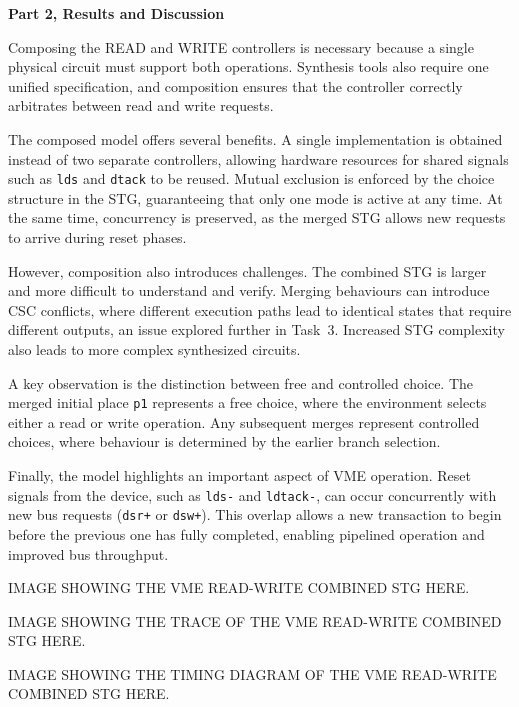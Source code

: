 \documentclass[a4paper,12pt]{article}
\begin{document}
\textbf{Part 2, Results and Discussion}

Composing the READ and WRITE controllers is necessary because a single physical circuit must support both operations. Synthesis tools also require one unified specification, and composition ensures that the controller correctly arbitrates between read and write requests.

The composed model offers several benefits. A single implementation is obtained instead of two separate controllers, allowing hardware resources for shared signals such as \texttt{lds} and \texttt{dtack} to be reused. Mutual exclusion is enforced by the choice structure in the STG, guaranteeing that only one mode is active at any time. At the same time, concurrency is preserved, as the merged STG allows new requests to arrive during reset phases.

However, composition also introduces challenges. The combined STG is larger and more difficult to understand and verify. Merging behaviours can introduce CSC conflicts, where different execution paths lead to identical states that require different outputs, an issue explored further in Task~3. Increased STG complexity also leads to more complex synthesized circuits.

A key observation is the distinction between free and controlled choice. The merged initial place \texttt{p1} represents a free choice, where the environment selects either a read or write operation. Any subsequent merges represent controlled choices, where behaviour is determined by the earlier branch selection.

Finally, the model highlights an important aspect of VME operation. Reset signals from the device, such as \texttt{lds-} and \texttt{ldtack-}, can occur concurrently with new bus requests (\texttt{dsr+} or \texttt{dsw+}). This overlap allows a new transaction to begin before the previous one has fully completed, enabling pipelined operation and improved bus throughput.

\begin{large}
    IMAGE SHOWING THE VME READ-WRITE COMBINED STG HERE.
\end{large}

\begin{large}
    IMAGE SHOWING THE TRACE OF THE VME READ-WRITE COMBINED STG HERE.
\end{large}

\begin{large}
    IMAGE SHOWING THE TIMING DIAGRAM OF THE VME READ-WRITE COMBINED STG HERE.
\end{large}
\end{document}
